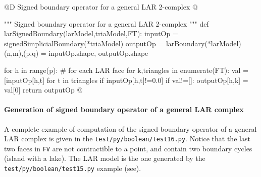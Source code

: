 \documentclass[11pt,oneside]{article}    %
\begin{document}
@D Signed boundary operator for a general LAR 2-complex
@{""" Signed boundary operator for a general LAR 2-complex """
def larSignedBoundary(larModel,triaModel,FT):
    inputOp = signedSimplicialBoundary(*triaModel)
    outputOp = larBoundary(*larModel)
    (n,m),(p,q) = inputOp.shape, outputOp.shape
    
    for h in range(p):   # for each LAR face
        for k,triangles in enumerate(FT):
            val = [inputOp[h,t] for t in triangles if inputOp[h,t]!=0.0]
            if val!=[]: outputOp[h,k] = val[0]
    return outputOp
@}



\paragraph{Generation of signed boundary operator of a general LAR complex}

A complete example of computation of the signed boundary operator of a general LAR complex is given in the \texttt{test/py/boolean/test16.py}. Notice that the last two faces in \texttt{FV} are not contractible to a point, and contain two boundary cycles (island with a lake). The LAR model is the one generated by the \texttt{test/py/boolean/test15.py} example (see).
\end{document}
